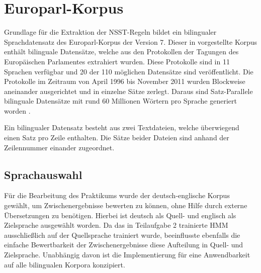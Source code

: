 \documentclass[conference]{IEEEtran}
\begin{document}
\section{Europarl-Korpus}
\label{Europarl-Korpus}
Grundlage für die Extraktion der NSST-Regeln bildet ein bilingualer Sprachdatensatz des Europarl-Korpus der Version 7.
Dieser in \cite{europarl} vorgestellte Korpus enthält bilinguale Daten\-sätze, welche aus den Protokollen der Tagungen des Europäischen Parlamentes extrahiert wurden.
Diese Protokolle sind in 11 Sprachen verfügbar und 20 der 110 möglichen Datensätze sind veröffentlicht.
Die Protokolle im Zeitraum von April 1996 bis November 2011 wurden Blockweise aneinander ausgerichtet und in einzelne Sätze zerlegt. 
Daraus sind Satz-Parallele bilinguale Datensätze mit rund 60 Millionen Wörtern pro Sprache generiert worden \cite{europarl:url}.

Ein bilingualer Datensatz besteht aus zwei Textdateien, welche überwiegend einen Satz pro Zeile enthalten. 
Die Sätze beider Dateien sind anhand der Zeilennummer einander zugeordnet.

\subsection{Sprachauswahl}
Für die Bearbeitung des Praktikums wurde der deutsch-englische Korpus gewählt, um Zwischenergebnisse bewerten zu können, ohne Hilfe durch externe Übersetzungen zu benötigen.
Hierbei ist deutsch als Quell- und englisch als Zielsprache ausgewählt worden.
Da das in Teilaufgabe 2 trainierte HMM ausschließlich auf der Quellsprache trainiert wurde, beeinflusste ebenfalls die einfache Bewertbarkeit der Zwischenergebnisse diese Aufteilung in Quell- und Zielsprache.
Unabhängig davon ist die Implementierung für eine Anwendbarkeit auf alle bilingualen Korpora konzipiert.
\end{document}
